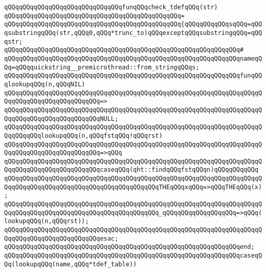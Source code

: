 \newline
\verb|qQQqqQQqqQQqqQQqqQQqqQQqqQQqqQQqfunqQQqcheck_tdefqQQq(str)|\newline
\verb|qQQqqQQqqQQqqQQqqQQqqQQqqQQqqQQqqQQqqQQqqQQqqQQq=|\newline
\verb|qQQqqQQqqQQqqQQqqQQqqQQqqQQqqQQqqQQqqQQqqQQqqQQq{qQQqqQQqqQQqsqQQq=qQQqsubstringqQQq(str,qQQq0,qQQq*trunc_to)qQQqexceptqQQqsubstringqQQq=qQQqstr;|\newline
\verb|qQQqqQQqqQQqqQQqqQQqqQQqqQQqqQQqqQQqqQQqqQQqqQQqqQQqqQQqqQQqqQQq#|\newline
\verb|qQQqqQQqqQQqqQQqqQQqqQQqqQQqqQQqqQQqqQQqqQQqqQQqqQQqqQQqqQQqqQQqnameqQQq=qQQqquickstring__premicrothread::from_stringqQQqs;|\newline
\newline
\verb|qQQqqQQqqQQqqQQqqQQqqQQqqQQqqQQqqQQqqQQqqQQqqQQqqQQqqQQqqQQqqQQqfunqQQqlookupqQQq(n,qQQqNIL)|\newline
\verb|qQQqqQQqqQQqqQQqqQQqqQQqqQQqqQQqqQQqqQQqqQQqqQQqqQQqqQQqqQQqqQQqqQQqqQQqqQQqqQQqqQQqqQQqqQQqqQQq=>|\newline
\verb|qQQqqQQqqQQqqQQqqQQqqQQqqQQqqQQqqQQqqQQqqQQqqQQqqQQqqQQqqQQqqQQqqQQqqQQqqQQqqQQqqQQqqQQqqQQqqQQqNULL;|\newline
\newline
\verb|qQQqqQQqqQQqqQQqqQQqqQQqqQQqqQQqqQQqqQQqqQQqqQQqqQQqqQQqqQQqqQQqqQQqqQQqqQQqqQQqlookupqQQq(n,qQQqfstqQQq!qQQqrst)|\newline
\verb|qQQqqQQqqQQqqQQqqQQqqQQqqQQqqQQqqQQqqQQqqQQqqQQqqQQqqQQqqQQqqQQqqQQqqQQqqQQqqQQqqQQqqQQqqQQqqQQq=>qQQq|\newline
\verb|qQQqqQQqqQQqqQQqqQQqqQQqqQQqqQQqqQQqqQQqqQQqqQQqqQQqqQQqqQQqqQQqqQQqqQQqqQQqqQQqqQQqqQQqqQQqqQQqcaseqQQq(qht::findqQQqfstqQQqn)qQQqqQQqqQQq|\newline
\verb|qQQqqQQqqQQqqQQqqQQqqQQqqQQqqQQqqQQqqQQqqQQqqQQqqQQqqQQqqQQqqQQqqQQqqQQqqQQqqQQqqQQqqQQqqQQqqQQqqQQqqQQqqQQqqQQqTHEqQQqxqQQq=>qQQqTHEqQQq(x);|\newline
\verb|qQQqqQQqqQQqqQQqqQQqqQQqqQQqqQQqqQQqqQQqqQQqqQQqqQQqqQQqqQQqqQQqqQQqqQQqqQQqqQQqqQQqqQQqqQQqqQQqqQQqqQQqqQQqqQQq_qQQqqQQqqQQqqQQqqQQq=>qQQq(lookupqQQq(n,qQQqrst));|\newline
\verb|qQQqqQQqqQQqqQQqqQQqqQQqqQQqqQQqqQQqqQQqqQQqqQQqqQQqqQQqqQQqqQQqqQQqqQQqqQQqqQQqqQQqqQQqqQQqqQQqesac;|\newline
\verb|qQQqqQQqqQQqqQQqqQQqqQQqqQQqqQQqqQQqqQQqqQQqqQQqqQQqqQQqqQQqqQQqend;|\newline
\newline
\verb|qQQqqQQqqQQqqQQqqQQqqQQqqQQqqQQqqQQqqQQqqQQqqQQqqQQqqQQqqQQqqQQqcaseqQQq(lookupqQQq(name,qQQq*tdef_table))|\newline
